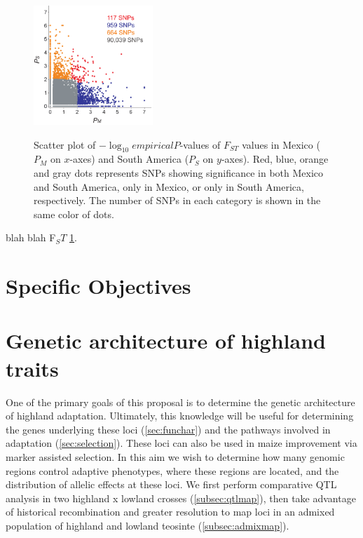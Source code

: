 \begin{figure}
  \centering \label{fig:fst}
   \includegraphics[width=0.4\textwidth]{fst.pdf}
  \caption{Scatter plot of $-\log_10 empirical P$-values of $F_{ST}$ values in Mexico ($P_M$ on $x$-axes) and South America ($P_S$ on $y$-axes).   Red, blue, orange and gray dots represents SNPs showing significance in both Mexico and South America, only in Mexico, or only in South America, respectively.  The number of SNPs in each category is shown in the same color of dots.} 
\end{figure}


blah blah F$_ST$ \ref{fig:fst}.

\section*{Specific Objectives}


\renewcommand{\thesection}{Aim \arabic{section}}
\section{Genetic architecture of highland traits} \label{sec:qtl}

One of the primary goals of this proposal is to determine the genetic architecture of highland adaptation. Ultimately, this knowledge will be useful for determining the genes underlying these loci (\ref{sec:funchar}) and the pathways involved in adaptation (\ref{sec:selection}). These loci can also be used in maize improvement via marker assisted selection. In this aim we wish to determine how many genomic regions control adaptive phenotypes, where these regions are located, and the distribution of allelic effects at these loci. We first perform comparative QTL analysis in two highland x lowland crosses (\ref{subsec:qtlmap}), then take advantage of historical recombination and greater resolution to map loci in an admixed population of highland and lowland teosinte (\ref{subsec:admixmap}).

